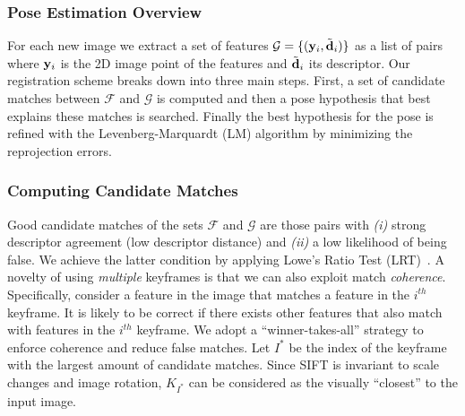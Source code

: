 \subsubsection{Pose Estimation Overview}
\label{sec:registration}
For each new image we extract a set of features  $\mathcal{G}=\{(\mathbf{y}_{i},\tilde{\mathbf{d}}_{i})\}$ as a list of pairs where $\mathbf{y}_{i}$ is the 2D image point of the features and $\tilde{\mathbf{d}}_{i}$ its descriptor. Our registration scheme breaks down into three main steps. First, a set of candidate matches between $\mathcal{F}$ and $\mathcal{G}$ is computed and then a pose hypothesis that best explains these matches is searched. Finally the best hypothesis for the pose is refined with the Levenberg-Marquardt (LM) algorithm by minimizing the reprojection errors.

\subsubsection{Computing Candidate Matches}
Good candidate matches of the sets $\mathcal{F}$ and $\mathcal{G}$ are those pairs with \textit{(i)} strong descriptor agreement (\ie low descriptor distance) and \textit{(ii)} a low likelihood of being false.
We achieve the latter condition by applying Lowe's Ratio Test (LRT)~\cite{Lowe:2004:DIF:993451.996342}.
A novelty of using \emph{multiple} keyframes is that we can also exploit match \emph{coherence}. Specifically, consider a feature in the image that matches a feature in the $i^{th}$ keyframe. It is likely to be correct if there exists other features that also match with features in the $i^{th}$ keyframe.
We adopt a ``winner-takes-all'' strategy to enforce coherence and reduce false matches.
Let $I^*$ be the index of the keyframe with the largest amount of candidate matches.
Since SIFT is invariant to scale changes and image rotation, $K_{I^*}$ can be considered as the visually ``closest'' to the input image. 
